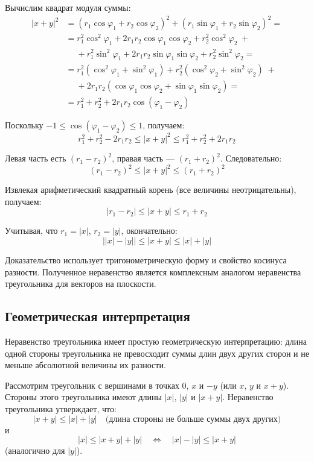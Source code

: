 \documentclass[a4paper,12pt]{article}
\theoremstyle{definition}
\theoremstyle{plain}
\theoremstyle{remark}
\begin{document}
	Вычислим квадрат модуля суммы:
	\[
	\begin{aligned}
		|x + y|^2 &= (r_1 \cos \varphi_1 + r_2 \cos \varphi_2)^2 + (r_1 \sin \varphi_1 + r_2 \sin \varphi_2)^2 = \\
		&= r_1^2 \cos^2 \varphi_1 + 2r_1 r_2 \cos \varphi_1 \cos \varphi_2 + r_2^2 \cos^2 \varphi_2 \;+ \\
		&\quad\; + r_1^2 \sin^2 \varphi_1 + 2r_1 r_2 \sin \varphi_1 \sin \varphi_2 + r_2^2 \sin^2 \varphi_2 = \\
		&= r_1^2(\cos^2 \varphi_1 + \sin^2 \varphi_1) + r_2^2(\cos^2 \varphi_2 + \sin^2 \varphi_2) \;+ \\
		&\quad\; + 2r_1 r_2 (\cos \varphi_1 \cos \varphi_2 + \sin \varphi_1 \sin \varphi_2) = \\
		&= r_1^2 + r_2^2 + 2r_1 r_2 \cos(\varphi_1 - \varphi_2)
	\end{aligned}
	\]
	
	Поскольку $-1 \leq \cos(\varphi_1 - \varphi_2) \leq 1$, получаем:
	\[
	r_1^2 + r_2^2 - 2r_1 r_2 \leq |x + y|^2 \leq r_1^2 + r_2^2 + 2r_1 r_2
	\]
	
	Левая часть есть $(r_1 - r_2)^2$, правая часть — $(r_1 + r_2)^2$. Следовательно:
	\[
	(r_1 - r_2)^2 \leq |x + y|^2 \leq (r_1 + r_2)^2
	\]
	
	Извлекая арифметический квадратный корень (все величины неотрицательны), получаем:
	\[
	|r_1 - r_2| \leq |x + y| \leq r_1 + r_2
	\]
	
	Учитывая, что $r_1 = |x|$, $r_2 = |y|$, окончательно:
	\[
	\bigl| |x| - |y| \bigr| \leq |x + y| \leq |x| + |y|
	\]
	
	\begin{tcolorbox}[colback=green!5, colframe=green!50!black, title=Пояснение]
		Доказательство использует тригонометрическую форму и свойство косинуса разности. Полученное неравенство является комплексным аналогом неравенства треугольника для векторов на плоскости.
	\end{tcolorbox}
	
	\subsection{Геометрическая интерпретация}
	
	Неравенство треугольника имеет простую геометрическую интерпретацию: длина одной стороны треугольника не превосходит суммы длин двух других сторон и не меньше абсолютной величины их разности.
	
	\begin{tcolorbox}[colback=blue!5, colframe=blue!40!black, title=Иллюстрация]
		Рассмотрим треугольник с вершинами в точках $0$, $x$ и $-y$ (или $x$, $y$ и $x+y$). Стороны этого треугольника имеют длины $|x|$, $|y|$ и $|x+y|$. Неравенство треугольника утверждает, что:
		\[
		|x+y| \leq |x| + |y| \quad \text{(длина стороны не больше суммы двух других)}
		\]
		и
		\[
		|x| \leq |x+y| + |y| \quad \Longleftrightarrow \quad |x| - |y| \leq |x+y|
		\]
		(аналогично для $|y|$).
	\end{tcolorbox}
	
\end{document}
